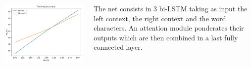 \documentclass[25pt, a0paper,
               colspace=15mm, subcolspace=0mm,
               blockverticalspace=17mm]{tikzposter} %
\begin{document}
\begin{columns}
{\vspace{-15pt}
\begin{center}
	\includegraphics{figures/prune_ratio}
\end{center}

The net consists in 3 bi-LSTM taking as input the left context, the right context and the word characters. An attention module ponderates their outputs which are then combined in a last fully connected layer.

}
\end{columns}
\end{document}
